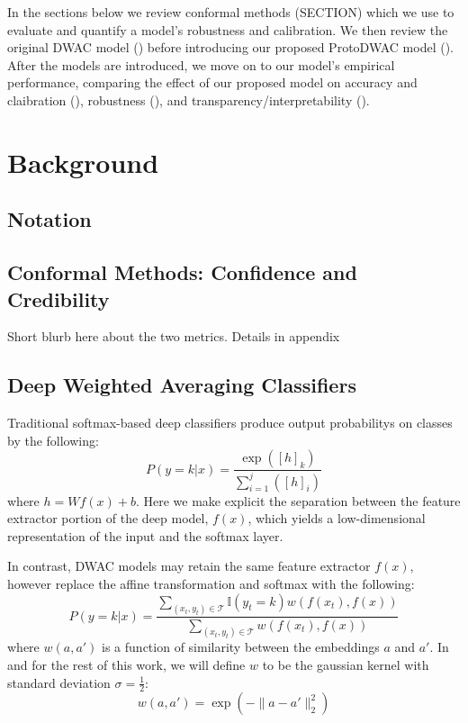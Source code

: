\documentclass[11pt,letterpaper]{article}
\newcommand{\mc}{\mathcal}
\newcommand{\I}{\mathbb{I}}
\begin{document}
In the sections below we review conformal methods (SECTION) which we use to evaluate and quantify a model's robustness and calibration. We then review the original DWAC model () before introducing
our proposed ProtoDWAC model (). After the models are introduced, we move on to our model's empirical performance, comparing the effect of our proposed model on accuracy and claibration (), robustness (), and transparency/interpretability ().

\section{Background}
\subsection{Notation}

\subsection{Conformal Methods: Confidence and Credibility}
Short blurb here about the two metrics. Details in appendix

\subsection{Deep Weighted Averaging Classifiers}
Traditional softmax-based deep classifiers produce output probabilitys on classes by the following:
\begin{equation}
  P(y = k | x) = \frac{\exp([h]_k)}{\sum_{i=1}^j([h]_i)}
\end{equation}
where $h = W f(x) + b$. Here we make explicit the separation between the feature extractor portion of the deep model, $f(x)$, which yields a low-dimensional representation of the input and the softmax layer.

In contrast, DWAC models may retain the same feature extractor $f(x)$, however replace the affine transformation and softmax with the following:
\begin{equation} \label{dwac:probs}
  P(y = k | x) = \frac{\sum_{(x_t, y_t) \in \mc{T}} \I(y_t = k) w(f(x_t), f(x))}{\sum_{(x_t, y_t) \in \mc{T}} w(f(x_t), f(x))}
\end{equation}
where $w(a, a')$ is a function of similarity between the embeddings $a$ and $a'$. In \citet{card.2019} and for the rest of this work, we will define $w$ to be the gaussian kernel with standard deviation $\sigma = \frac{1}{2}$:
\begin{equation}
  w(a, a') = \exp(- \| a - a' \|_2^2)
\end{equation}
\end{document}
